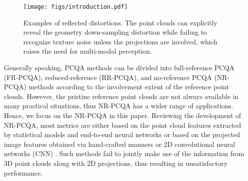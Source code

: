 \documentclass{article}
\begin{document}
\begin{figure}[t]
    \centering
    \texttt{[image: figs/introduction.pdf]}
    \caption{Examples of reflected distortions. The point clouds can explicitly reveal the geometry down-sampling distortion while failing to recognize texture noise unless the projections are involved, which raises the need for multi-modal perception. }
    \label{fig:introduction}
    \vspace{-0.5cm}
\end{figure}


Generally speaking, PCQA methods can be divided into full-reference PCQA (FR-PCQA), reduced-reference (RR-PCQA), and no-reference PCQA (NR-PCQA) methods according to the involvement extent of the reference point clouds. However, the pristine reference point clouds are not always available in many practical situations, thus NR-PCQA has a wider range of applications. Hence, we focus on the NR-PCQA in this paper. Reviewing the development of NR-PCQA, most metrics are either based on the point cloud features extracted by statistical models \cite{zhang2021mesh,zhang2021no} and end-to-end neural networks \cite{liu2022point} or based on the projected image features obtained via hand-crafted manners \cite{meynet2020pcqm,yang2020graphsim,alexiou2020pointssim} or 2D convolutional neural networks (CNN) \cite{liu2021pqa,fan2022no,zhang2022treating}. Such methods fail to jointly make use of the information from 3D point clouds along with 2D projections, thus resulting in unsatisfactory performance. 
\end{document}
